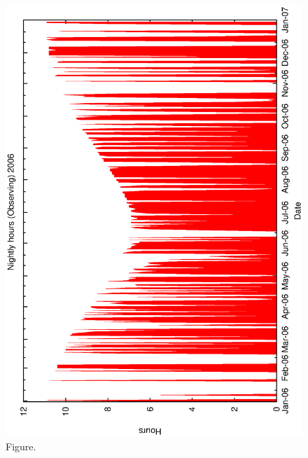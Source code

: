 \documentclass[12pt,a4paper]{article}
\begin{document}
\begin{figure}[htbp]
 \begin{center}
  \includegraphics[scale=1.0, angle=0]{figures/met_nightly_stats_obs2006.eps}
 \end{center}
  \caption[Figure.]
{Figure.}
\end{figure}
\clearpage
\end{document}
